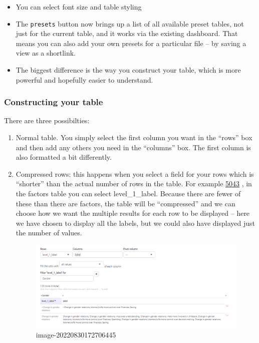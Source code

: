 \documentclass[
]{book}
\providecommand{\tightlist}{%
  \setlength{\itemsep}{0pt}\setlength{\parskip}{0pt}}
\begin{document}
\begin{itemize}
\tightlist
\item
  You can select font size and table styling
\item
  The \texttt{presets} button now brings up a list of all available preset tables, not just for the current table, and it works via the existing dashboard. That means you can also add your own presets for a particular file -- by saving a view as a shortlink.
\item
  The biggest difference is the way you construct your table, which is more powerful and hopefully easier to understand.
\end{itemize}

\hypertarget{constructing-your-table}{%
\subsubsection{Constructing your table}\label{constructing-your-table}}

There are three possibilties:

\begin{enumerate}
\def\labelenumi{\arabic{enumi})}
\item
  Normal table. You simply select the first column you want in the ``rows'' box and then add any others you need in the ``columns'' box. The first column is also formatted a bit differently.
\item
  Compressed rows: this happens when you select a field for your rows which is ``shorter'' than the actual number of rows in the table. For example \href{https://causalmap.shinyapps.io/tokyo/?s=5043}{5043} , in the factors table you can select level\_1\_label. Because there are fewer of these than there are factors, the table will be ``compressed'' and we can choose how we want the multiple results for each row to be displayed -- here we have chosen to display all the labels, but we could also have displayed just the number of values.

  \begin{figure}
  \centering
  \includegraphics{_assets/image-20220830172706445.png}
  \caption{image-20220830172706445}
  \end{figure}
\end{enumerate}
\end{document}
